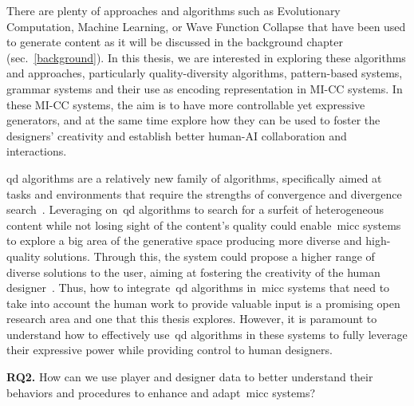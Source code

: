 There are plenty of approaches and algorithms such as Evolutionary Computation, Machine Learning, or Wave Function Collapse that have been used to generate content as it will be discussed in the background chapter (sec.~\ref{background}). In this thesis, we are interested in exploring these algorithms and approaches, particularly quality-diversity algorithms, pattern-based systems, grammar systems and their use as encoding representation in MI-CC systems. In these MI-CC systems, the aim is to have more controllable yet expressive generators, and at the same time explore how they can be used to foster the designers' creativity and establish better human-AI collaboration and interactions.

\acrfull{qd} algorithms are a relatively new family of algorithms, specifically aimed at tasks and environments that require the strengths of convergence and divergence search~\cite{pugh_quality_2016}. Leveraging on~\acrshort{qd} algorithms to search for a surfeit of heterogeneous content while not losing sight of the content's quality could enable~\acrshort{micc} systems to explore a big area of the generative space producing more diverse and high-quality solutions. Through this, the system could propose a higher range of diverse solutions to the user, aiming at fostering the creativity of the human designer~\cite{liapis_can_2016}. Thus, how to integrate~\acrshort{qd} algorithms in~\acrshort{micc} systems that need to take into account the human work to provide valuable input is a promising open research area and one that this thesis explores. However, it is paramount to understand how to effectively use~\acrshort{qd} algorithms in these systems to fully leverage their expressive power while providing control to human designers.

\begin{retQuestion}{}\sloppy
   \textbf{RQ2.} How can we use player and designer data to better understand their behaviors and procedures to enhance and adapt~\acrlong{micc} systems?
   
   
   
   
\end{retQuestion}


